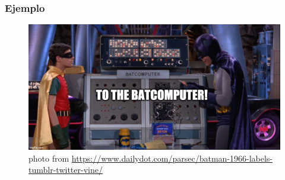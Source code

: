 \documentclass[
  shownotes,
  xcolor={svgnames},
  hyperref={colorlinks,citecolor=DarkBlue,linkcolor=andesred,urlcolor=DarkBlue}
  , aspectratio=169]{beamer}
\begin{document}
\begin{frame}[fragile]
\frametitle{Ejemplo}
\begin{figure}[H] \centering
  \centering
  \includegraphics[scale=0.35]{figures/baticomputer_meme.jpg}
  \\
  \tiny photo from \url{https://www.dailydot.com/parsec/batman-1966-labels-tumblr-twitter-vine/}
\end{figure}

\end{frame}



\end{document}
